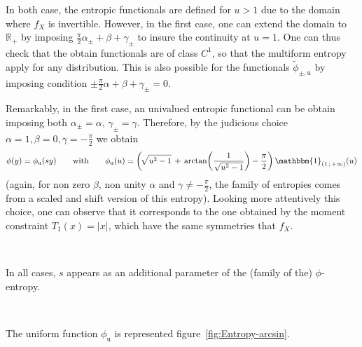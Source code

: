 \documentclass[entropy,article,submit,moreauthors,pdftex]{Definitions/mdpi}
\newcommand{\SZ}[1]{{\color{blue} #1}}                                       %
\newcommand{\jfb}[1]{{\color{red} #1}}                                       %
\def\Rset{\mathbb{R}}%
\def\un{\mathbbm{1}}%
\def\u{\mathrm{u}}
\begin{document}
{In both case, the entropic functionals are defined for $u > 1$ due to the domain
where $f_X$ is invertible. However, in the first case, one can extend the domain
to  $\Rset_+$ by  imposing $\frac{\pi}{2}  \alpha_\pm +  \beta +  \gamma_\pm$ to
insure  the  continuity  at $u  =  1$.   One  can  thus check  that  the  obtain
functionals are  of class  $C^1$, so  that the multiform  entropy apply  for any
distribution.     This     is    also     possible    for     the    functionals
$\widetilde{\phi}_{\pm,\u}$  by  imposing condition  $\pm  \frac{\pi}{2}
\alpha + \beta + \gamma_\pm = 0$.

Remarkably, in  the first case, an  univalued entropic functional can  be obtain
imposing both $\alpha_\pm  = \alpha, \, \gamma_\pm = \gamma$.  Therefore, by the
judicious choice  $\alpha =  1, \beta  = 0, \gamma  = -\frac{\pi}{2}$  we obtain
%
\[
\phi(y) = \phi_\u(s y) \qquad \mbox{with} \qquad \phi_\u(u) =
\left( \! \sqrt{u^2  - 1} \,  + \,  \arctan\left( \frac{1}{\sqrt{u^2 -  1}} \right)
 - \frac{\pi}{2} \right) \, \un_{\left( 1 \, ; \, +\infty \right)}(u)
\]
%
(again,  for   non  zero  $\beta$,  non   unity  $\alpha$  and  $\gamma   \ne  -
\frac{\pi}{2}$, the family of entropies comes from a scaled and shift version of
this entropy).  Looking more attentively  this choice,  one can observe  that it
corresponds to the  one obtained by the moment constraint  $T_1(x) = |x|$, which
have the same symmetries that $f_X$.}

\

\SZ{In all cases, $s$ appears as an  additional parameter of the (family of the)
  $\phi$-entropy.}

\

The      uniform      function      $\phi_\u$      is      represented
figure~\ref{fig:Entropy-arcsin}.
 
\end{document}
